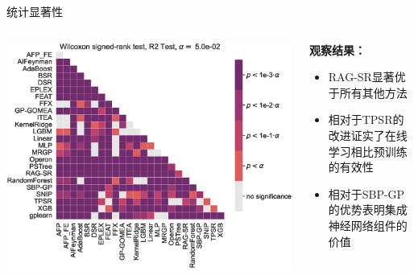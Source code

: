 \documentclass[aspectratio=1610]{beamer}
\begin{document}
    \begin{frame}{统计显著性}
        \begin{columns}
            \begin{column}{0.48\textwidth}
                \begin{center}
                    \includegraphics[width=\textwidth]{figs/Pairwise_comparison_of_R2_Test_on_black-box_problems.eps}
                \end{center}
            \end{column}

            \begin{column}{0.48\textwidth}
                \textbf{观察结果：}
                \begin{itemize}
                    \item RAG-SR显著优于所有其他方法
                    \item 相对于TPSR的改进证实了在线学习相比预训练的有效性
                    \item 相对于SBP-GP的优势表明集成神经网络组件的价值
                \end{itemize}
            \end{column}
        \end{columns}
    \end{frame}
\end{document}
